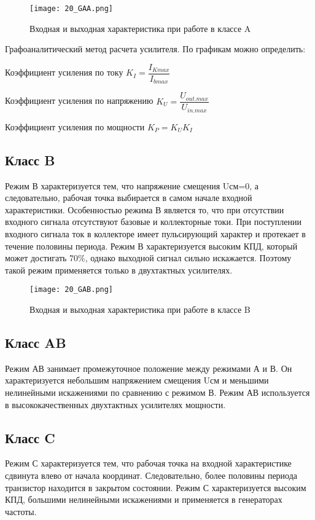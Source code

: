 \begin{figure}[H]
\centering
\texttt{[image: 20\_GAA.png]}
\caption{Входная и выходная характеристика при работе в классе A}
\label{fig:20_GAA}
\end{figure}

Графоаналитический метод расчета усилителя. По графикам можно определить:

Коэффициент усиления по току $K_I = \dfrac{I_{Kmax}}{I_{bmax}}$

Коэффициент усиления по напряжению $K_U = \dfrac{U_{out.max}}{U_{in.max}}$

Коэффициент усиления по мощности $K_P = K_U K_I$

\subsection*{Класс B}

Режим В характеризуется тем, что напряжение смещения Uсм=0, а следовательно, рабочая точка выбирается в самом начале входной характеристики. Особенностью режима В является то, что при отсутствии входного сигнала отсутствуют базовые и коллекторные токи. 
При поступлении входного сигнала ток в коллекторе имеет пульсирующий характер и протекает в течение половины периода. Режим В характеризуется высоким КПД, который может достигать 70\%, однако выходной сигнал сильно искажается. Поэтому такой режим применяется только в двухтактных усилителях.

\begin{figure}[H]
\centering
\texttt{[image: 20\_GAB.png]}
\caption{Входная и выходная характеристика при работе в классе B}
\label{fig:20_GAB}
\end{figure}

\subsection*{Класс AB}

Режим АВ занимает промежуточное положение между режимами А и В. Он характеризуется небольшим напряжением смещения Uсм и меньшими нелинейными искажениями по сравнению с режимом В. Режим АВ используется в высококачественных двухтактных усилителях мощности.

\subsection*{Класс C}

Режим С характеризуется тем, что рабочая точка на входной характеристике сдвинута влево от начала координат. Следовательно, более половины периода транзистор находится в закрытом состоянии. Режим С характеризуется высоким КПД, большими нелинейными искажениями и применяется в генераторах частоты.


